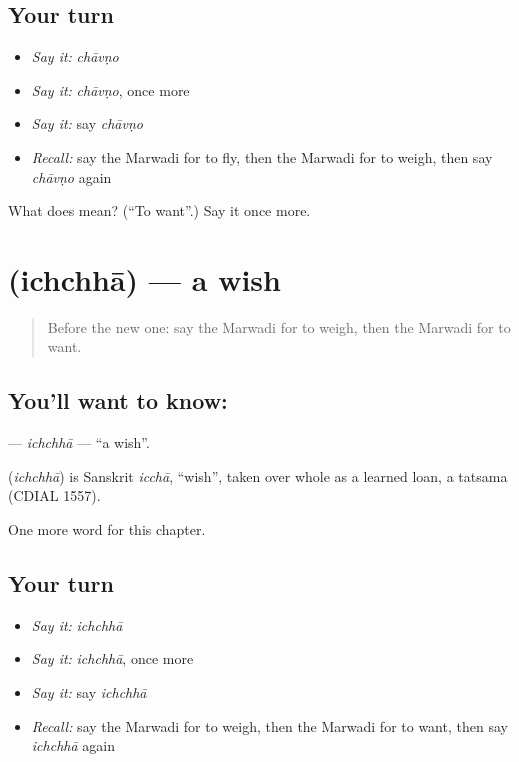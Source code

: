 \subsection*{Your turn}
\begin{itemize}
\raggedright
  \item \emph{Say it:} \emph{chāvṇo}
  \item \emph{Say it:} \emph{chāvṇo}, once more
  \item \emph{Say it:} say \emph{chāvṇo}
  \item \emph{Recall:} say the Marwadi for to fly, then the Marwadi for to weigh, then say \emph{chāvṇo} again
\end{itemize}

\begin{tcolorbox}[breakable,colback=teal!4,colframe=teal!35!black,title={Before you move on}]
What does  mean? (\textquotedblleft{}To want\textquotedblright{}.) Say it once more.
\end{tcolorbox}
\section[\texorpdfstring{\mw{इच्छा} (ichchhā)}{इच्छा (ichchhā)}]{ (ichchhā) — a wish}

\label{lesson:MW-C111-ichchha}



\begin{quote}
Before the new one: say the Marwadi for to weigh, then the Marwadi for to want.
\end{quote}

\subsection*{You'll want to know: }
\textbf{} — \emph{ichchhā} — \textquotedblleft{}a wish\textquotedblright{}.

\begin{cousinweb}
\textbf{} (\emph{ichchhā}) is Sanskrit \emph{icchā}, \textquotedblleft{}wish\textquotedblright{}, taken over whole as a learned loan, a tatsama (CDIAL 1557).
\end{cousinweb}

\begin{grammarlens}[title={What you've built}]
One more word for this chapter.
\end{grammarlens}

\subsection*{Your turn}
\begin{itemize}
\raggedright
  \item \emph{Say it:} \emph{ichchhā}
  \item \emph{Say it:} \emph{ichchhā}, once more
  \item \emph{Say it:} say \emph{ichchhā}
  \item \emph{Recall:} say the Marwadi for to weigh, then the Marwadi for to want, then say \emph{ichchhā} again
\end{itemize}


